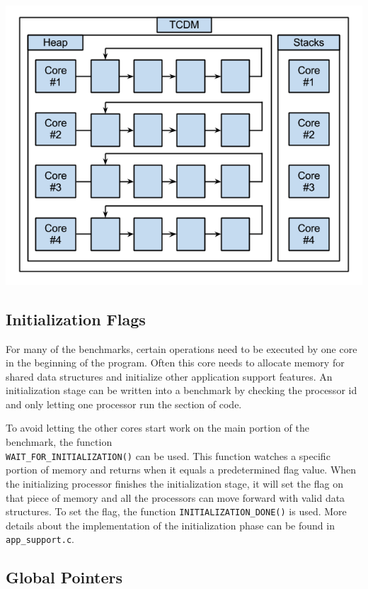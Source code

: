 \documentclass{article}
\begin{document}
\begin{center}
\includegraphics[scale = .65]{pictures/per_core.png}
\end{center}

\subsection{Initialization Flags}

For many of the benchmarks, certain operations need to be executed by one core in the beginning
of the program.  Often this core needs to allocate memory for shared data structures and initialize 
other application support features.  An initialization stage can be written into a benchmark by checking
the processor id and only letting one processor run the section of code.  

To avoid letting the other cores start work on the main portion of the benchmark, the function \\ \verb|WAIT_FOR_INITIALIZATION()| can
be used.  This function watches a specific portion of memory and returns when it equals a predetermined 
flag value.  When the initializing processor finishes the initialization stage, it will set the flag on that piece of
memory and all the processors can move forward with valid data structures.  To set the flag, the function \verb|INITIALIZATION_DONE()| is used. 
 More details about the implementation of the initialization phase can be found in \verb|app_support.c|.

\subsection{Global Pointers}
\end{document}
